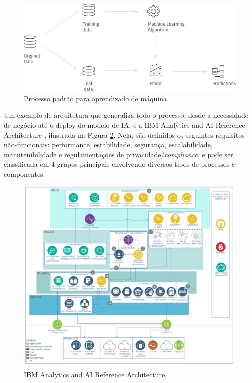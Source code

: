 \documentclass[portugues]{ic-tese}
\begin{document}
\begin{figure}[h]
\centering
\includegraphics[scale=0.5]{images/ML_Process.jpg}
\caption {Processo padrão para aprendizado de máquina}
\label{fig:MLProcess}
\end{figure}

Um exemplo de arquitetura que generaliza todo o processo, desde a necessidade de negócio até o deploy do modelo de IA, é a IBM Analytics and AI Reference Architecture \citep{IBM_2021}, ilustrada na Figura \ref{fig:AIReferenceArchitecture}. Nela, são definidos os seguintes requisitos não-funcionais: performance, estabilidade, segurança, escalabilidade, manutenibilidade e regulamentações de privacidade/\textit{compliance}, e pode ser classificada em 4 grupos principais envolvendo diversos tipos de processos e componentes:

\begin{figure}[h]
\centering
\includegraphics[scale=0.25]{images/ai-analytics-ref-diagram-analyze.jpg}
\caption {IBM Analytics and AI Reference Architecture.}
\label{fig:AIReferenceArchitecture}
\end{figure}
\end{document}
